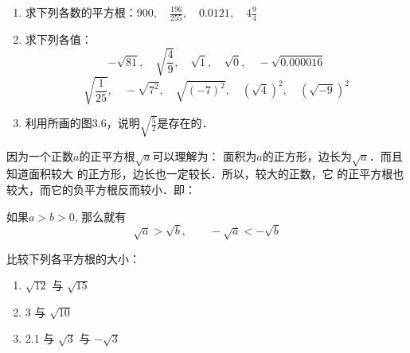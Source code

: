 \begin{ex}
\begin{enumerate}
    \item 求下列各数的平方根：$900,\quad 
    \frac{196}{255},\quad 0.0121,\quad 4\frac{9}{4}$

\item 求下列各值：
\[-\sqrt{81},\quad \sqrt{\frac{4}{9}},\quad \sqrt{1},\quad \sqrt{0},\quad -\sqrt{0.000016}\]
\[\sqrt{\frac{1}{25}},\quad -\sqrt{7^2},\quad \sqrt{(-7)^2},\quad \left(\sqrt{4}\right)^2,\quad \left(\sqrt{-9}\right)^2\]

\item 利用所画的图3.6，说明$\sqrt{\frac{5}{2}}$是存在的．
 \end{enumerate}
\end{ex}


\begin{figure}[htp]
    \centering
    \caption{}
\end{figure}

因为一个正数$a$的正平方根$\sqrt{a}$可以理解为：
面积为$a$的正方形，边长为$\sqrt{a}$．而且知道面积较大
的正方形，边长也一定较长．所以，较大的正数，它
的正平方根也较大，而它的负平方根反而较小．即：

\begin{blk}{}
    如果$a>b>0$, 那么就有
    $$\sqrt{a}>\sqrt{b},\qquad -\sqrt{a}<-\sqrt{b}$$
\end{blk}

 
\begin{example}
比较下列各平方根的大小：
\begin{enumerate}
    \item $\sqrt{12}$ 与 $\sqrt{15}$
    \item 3 与 $\sqrt{10}$
    \item 2.1 与 $\sqrt{3}$ 与 $-\sqrt{3}$
\end{enumerate}
\end{example}

